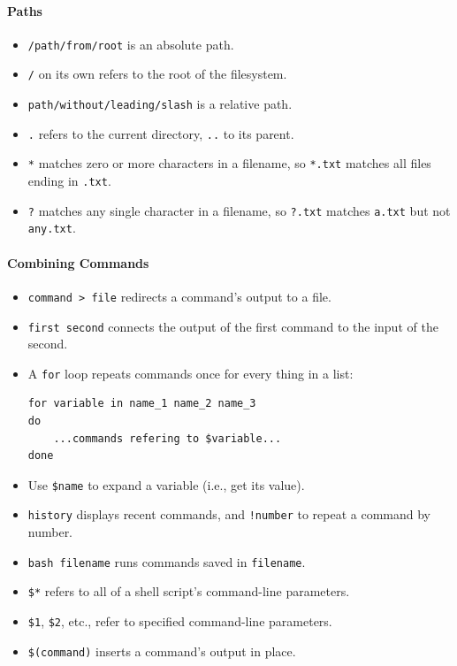 \documentclass[]{book}
\begin{document}
\mbox{}\paragraph{Paths}

\begin{itemize}
\item
  \texttt{/path/from/root} is an absolute path.
\item
  \texttt{/} on its own refers to the root of the filesystem.
\item
  \texttt{path/without/leading/slash} is a relative path.
\item
  \texttt{.} refers to the current directory, \texttt{..} to its parent.
\item
  \texttt{*} matches zero or more characters in a filename, so
  \texttt{*.txt} matches all files ending in \texttt{.txt}.
\item
  \texttt{?} matches any single character in a filename, so
  \texttt{?.txt} matches \texttt{a.txt} but not \texttt{any.txt}.
\end{itemize}

\mbox{}\paragraph{Combining Commands}

\begin{itemize}
\item
  \texttt{command \textgreater{} file} redirects a command's output to a
  file.
\item
  \texttt{first \textbar{} second} connects the output of the first
  command to the input of the second.
\item
  A \texttt{for} loop repeats commands once for every thing in a list:

\begin{verbatim}
for variable in name_1 name_2 name_3
do
    ...commands refering to $variable...
done
\end{verbatim}
\item
  Use \texttt{\$name} to expand a variable (i.e., get its value).
\item
  \texttt{history} displays recent commands, and \texttt{!number} to
  repeat a command by number.
\item
  \texttt{bash filename} runs commands saved in \texttt{filename}.
\item
  \texttt{\$*} refers to all of a shell script's command-line
  parameters.
\item
  \texttt{\$1}, \texttt{\$2}, etc., refer to specified command-line
  parameters.
\item
  \texttt{\$(command)} inserts a command's output in place.
\end{itemize}
\end{document}
